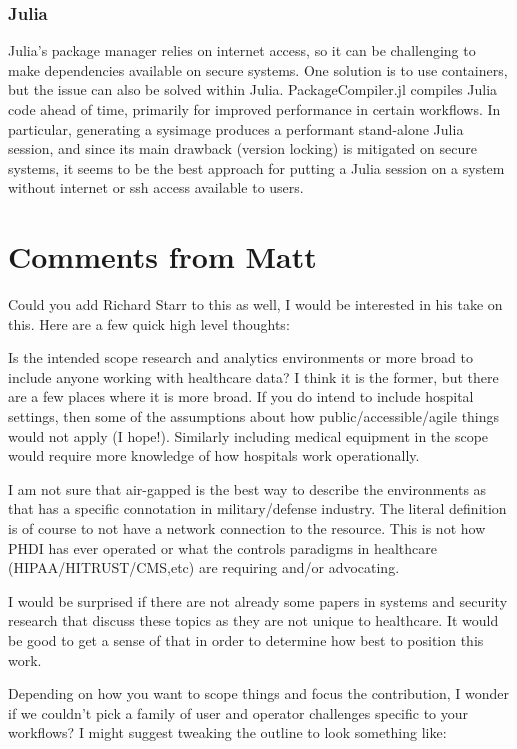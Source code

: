 \documentclass{amia}
\begin{document}
\subsubsection*{Julia}

Julia's package manager relies on internet access, so it can be challenging to make dependencies available on secure systems. One solution is to use containers, but the issue can also be solved within Julia. PackageCompiler.jl compiles Julia code ahead of time, primarily for improved performance in certain workflows. In particular, generating a sysimage produces a performant stand-alone Julia session, and since its main drawback (version locking) is mitigated on secure systems, it seems to be the best approach for putting a Julia session on a system without internet or ssh access available to users. 

\section{Comments from Matt}

Could you add Richard Starr to this as well, I would be interested in his take on this. Here are a few quick high level thoughts:
 
Is the intended scope research and analytics environments or more broad to include anyone working with healthcare data? I think it is the former, but there are a few places where it is more broad.  If you do intend to include hospital settings, then some of the assumptions about how public/accessible/agile things would not apply (I hope!). Similarly including medical equipment in the scope would require more knowledge of how hospitals work operationally.
 
I am not sure that air-gapped is the best way to describe the environments as that has a specific connotation in military/defense industry. The literal definition is of course to not have a network connection to the resource. This is not how PHDI has ever operated or what the controls paradigms in healthcare (HIPAA/HITRUST/CMS,etc) are requiring and/or advocating.
 
I would be surprised if there are not already some papers in systems and security research that discuss these topics as they are not unique to healthcare. It would be good to get a sense of that in order to determine how best to position this work.
 
Depending on how you want to scope things and focus the contribution, I wonder if we couldn’t pick a family of user and operator challenges specific to your workflows? I might suggest tweaking the outline to look something like:
 
\end{document}
